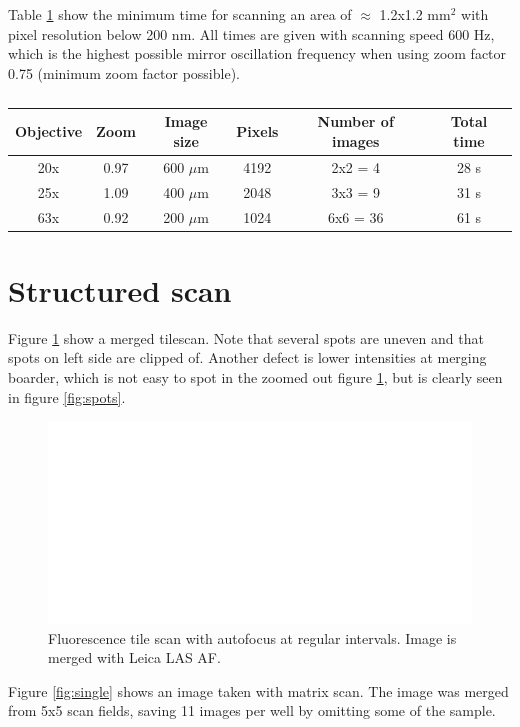 Table \ref{tab:obj_time} show the minimum time for scanning an area of $\approx$ 1.2x1.2 mm$^2$ with pixel resolution below 200 nm. All times are given with scanning speed 600 Hz, which is the highest possible mirror oscillation frequency when using zoom factor 0.75 (minimum zoom factor possible).

\begin{table}[h]
\centering
\begin{tabular}{c c c c c c}
\hline
Objective & Zoom & Image size & Pixels & Number of images & Total time\\
\hline
20x & 0.97 & 600 $\mu$m & 4192 & 2x2 = 4 & 28 s \\
25x & 1.09 & 400 $\mu$m & 2048 & 3x3 = 9 & 31 s \\
63x & 0.92 & 200 $\mu$m & 1024 & 6x6 = 36 & 61 s \\
\hline
\end{tabular}
\caption{}
\label{tab:obj_time}
\end{table}


%
%
\section{Structured scan}
Figure \ref{fig:res_tilescan} show a merged tilescan. Note that several spots are uneven and that spots on left side are clipped of. Another defect is lower intensities at merging boarder, which is not easy to spot in the zoomed out figure \ref{fig:res_tilescan}, but is clearly seen in figure \ref{fig:spots}.

\begin{figure}[h]
\centering
\includegraphics[width=\textwidth]{result_tilescan}
\caption{Fluorescence tile scan with autofocus at regular intervals. Image is merged with Leica LAS AF.}
\label{fig:res_tilescan}
\end{figure}

Figure \ref{fig:single} shows an image taken with matrix scan. The image was merged from 5x5 scan fields, saving 11 images per well by omitting some of the sample.

